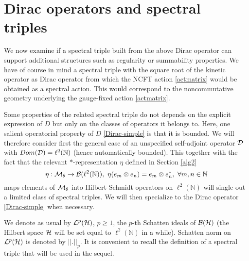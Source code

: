 \documentclass[a4paper,11pt,twoside]{article}
\numberwithin{equation}{section}
\theoremstyle{nonumberplain}
\begin{document}

\section{Dirac operators and spectral triples}\label{ncg}
We now examine if a spectral triple built from the above Dirac operator can support additional structures such as regularity or summability properties. We have of course in mind a spectral triple with the square root of the kinetic operator as Dirac operator from which the NCFT action \eqref{actmatrix} would be obtained as a spectral action. This would correspond to the noncommutative geometry underlying the gauge-fixed action \eqref{actmatrix}.\par 

Some properties of the related spectral triple do not depends on the explicit expression of $D$ but only on the classes of operators it belongs to. Here, one salient operatorial property of $D$ \eqref{Dirac-simple} is that it is bounded. We will therefore consider first the general case of an unspecified self-adjoint operator ${\cal{D}}$ with $Dom({\cal{D}})=\ell^2(\mathbb{N})$ (hence automatically bounded). This together with the fact that the relevant $*$-representation $\eta$ defined in Section \ref{alg2} 
\begin{equation}
\eta:{\cal{M}}_\theta\to{\cal{B}}(\ell^2(\mathbb{N})),\ \eta(e_m\otimes e_n)=e_m\otimes e^*_n,\ \forall m,n\in\mathbb{N}\label{Left-representation}
\end{equation}
maps elements of ${\cal{M}}_\theta$ into Hilbert-Schmidt operators on $\ell^2(\mathbb{N})$ will single out a limited class of spectral triples. We will then specialize to the Dirac operator \eqref{Dirac-simple} when necessary.\par

We denote as usual by ${\cal{L}}^p({\cal{H}})$, $p\ge1$, the $p$-th Schatten ideals of ${\cal{B}}({\cal{H}})$ (the Hilbert space ${\cal{H}}$ will be set equal to $\ell^2(\mathbb{N})$ in a while). Schatten norm on ${\cal{L}}^p({\cal{H}})$ 
is denoted by $||.||_p$. It is convenient to recall the definition of a spectral triple that will be used in the sequel.
\end{document}
